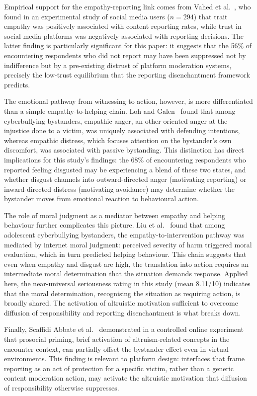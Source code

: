 \documentclass{ieee-portfolio}
\begin{document}
Empirical support for the empathy-reporting link comes from Vahed et al.~\cite{vahed_moral_2024}, who found in an experimental study of social media users ($n = 294$) that trait empathy was positively associated with content reporting rates, while trust in social media platforms was negatively associated with reporting decisions. The latter finding is particularly significant for this paper: it suggests that the 56\% of encountering respondents who did not report may have been suppressed not by indifference but by a pre-existing distrust of platform moderation systems, precisely the low-trust equilibrium that the reporting disenchantment framework predicts.

The emotional pathway from witnessing to action, however, is more differentiated than a simple empathy-to-helping chain. Loh and Galen~\cite{steinvik_bystanders_2023} found that among cyberbullying bystanders, empathic anger, an other-oriented anger at the injustice done to a victim, was uniquely associated with defending intentions, whereas empathic distress, which focuses attention on the bystander's own discomfort, was associated with passive bystanding. This distinction has direct implications for this study's findings: the 68\% of encountering respondents who reported feeling disgusted may be experiencing a blend of these two states, and whether disgust channels into outward-directed anger (motivating reporting) or inward-directed distress (motivating avoidance) may determine whether the bystander moves from emotional reaction to behavioural action.

The role of moral judgment as a mediator between empathy and helping behaviour further complicates this picture. Liu et al.~\cite{hu_empathy_2023} found that among adolescent cyberbullying bystanders, the empathy-to-intervention pathway was mediated by internet moral judgment: perceived severity of harm triggered moral evaluation, which in turn predicted helping behaviour. This chain suggests that even when empathy and disgust are high, the translation into action requires an intermediate moral determination that the situation demands response. Applied here, the near-universal seriousness rating in this study (mean 8.11/10) indicates that the moral determination, recognising the situation as requiring action, is broadly shared. The activation of altruistic motivation sufficient to overcome diffusion of responsibility and reporting disenchantment is what breaks down.

Finally, Scaffidi Abbate et al.~\cite{scaffidi_prosocial_2022} demonstrated in a controlled online experiment that prosocial priming, brief activation of altruism-related concepts in the encounter context, can partially offset the bystander effect even in virtual environments. This finding is relevant to platform design: interfaces that frame reporting as an act of protection for a specific victim, rather than a generic content moderation action, may activate the altruistic motivation that diffusion of responsibility otherwise suppresses.
\end{document}
